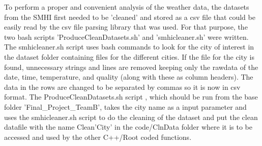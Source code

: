To perform a proper and convenient analysis of the weather data, the datasets from the SMHI first needed to be 'cleaned' and stored as a csv file that could be easily read by the csv file parsing library that was used. For that purpose, the two bash scripts 'ProduceCleanDatasets.sh' and 'smhicleaner.sh' were written. The smhicleaner.sh script uses bash commands to look for the city of interest in the dataset folder containing files for the different cities. If the file for the city is found, unnecessary strings and lines are removed keeping only the rawdata of the date, time, temperature, and quality (along with these as column headers). The data in the rows are changed to be separated by commas so it is now in csv format. The ProduceCleanDatasets.sh script , which should be run from the base folder 'Final\_Project\_TeamB', takes the city name as a input parameter and uses the smhicleaner.sh script to do the cleaning of the dataset and put the clean datafile with the name Clean'City' in the code/ClnData folder where it is to be accessed and used by the other C++/Root coded functions.     